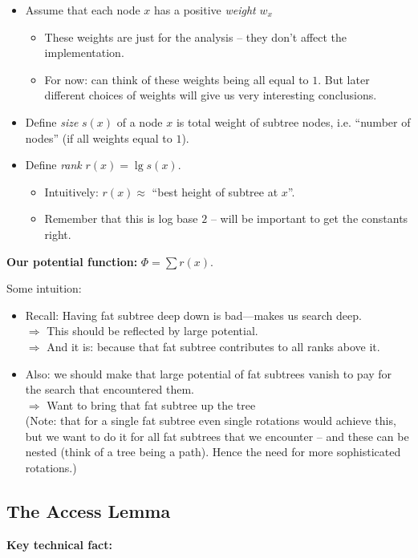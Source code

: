 \documentclass{article}
\begin{document}
\begin{itemize}
\item Assume that each node $x$ has a positive {\em weight} $w_x$ 
\begin{itemize}
\item These weights are just for the analysis -- they don't affect the implementation.
\item For now: can think of these weights being all equal to $1$. But later different choices of weights will give us very interesting conclusions. 
\end{itemize}
\item Define {\em size} $s(x)$ of a node $x$ is total weight of subtree nodes, i.e. ``number of nodes'' (if all weights equal to $1$).
\item Define {\em rank} $r(x)=\lg s(x)$.
\begin{itemize}
\item Intuitively: $r(x) \approx$ ``best height of subtree at $x$''.
\item Remember that this is log base $2$ -- will be important to get the constants right.
\end{itemize}
\end{itemize}

{\bf Our potential function:} $\Phi=\sum r(x)$.

Some intuition:
\begin{itemize}
\item Recall: Having fat subtree deep down is bad---makes us search deep.\\
$\Rightarrow$ This should be reflected by large potential.\\
$\Rightarrow$ And it is: because that fat subtree contributes to all ranks
  above it.
\item Also: we should make that large potential of fat subtrees vanish to pay for the search that encountered them.\\
$\Rightarrow$ Want to bring that fat subtree up the tree\\
(Note: that for a single fat subtree even single rotations would achieve this, but we want to do it for all fat subtrees that we encounter -- and these can be nested (think of a tree being a path). Hence the  need for more sophisticated rotations.)
\end{itemize}


\subsection{The Access Lemma}
{\bf Key technical fact:}
\end{document}
